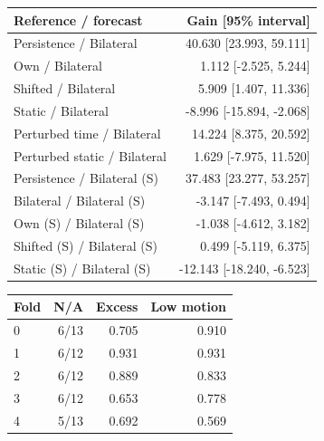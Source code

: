 \documentclass[letterpaper]{article}
\begin{document}
\begin{center}\begin{minipage}{\columnwidth}
\centering
\small
\begin{tabular}{lr}
\toprule
Reference / forecast & Gain [95\% interval] \\
\midrule
Persistence / Bilateral & 40.630 [23.993, 59.111] \\
Own / Bilateral & 1.112 [-2.525, 5.244] \\
Shifted / Bilateral & 5.909 [1.407, 11.336] \\
Static / Bilateral & -8.996 [-15.894, -2.068] \\
Perturbed time / Bilateral & 14.224 [8.375, 20.592] \\
Perturbed static / Bilateral & 1.629 [-7.975, 11.520] \\
Persistence / Bilateral (S) & 37.483 [23.277, 53.257] \\
Bilateral / Bilateral (S) & -3.147 [-7.493, 0.494] \\
Own (S) / Bilateral (S) & -1.038 [-4.612, 3.182] \\
Shifted (S) / Bilateral (S) & 0.499 [-5.119, 6.375] \\
Static (S) / Bilateral (S) & -12.143 [-18.240, -6.523] \\
\bottomrule
\end{tabular}
\end{minipage}\end{center}

\begin{center}\begin{minipage}{\columnwidth}
\centering
\small
\begin{tabular}{lrrr}
\toprule
Fold & N/A & Excess & Low motion \\
\midrule
0 & 6/13 & 0.705 & 0.910 \\
1 & 6/12 & 0.931 & 0.931 \\
2 & 6/12 & 0.889 & 0.833 \\
3 & 6/12 & 0.653 & 0.778 \\
4 & 5/13 & 0.692 & 0.569 \\
\bottomrule
\end{tabular}
\end{minipage}\end{center}
\end{document}
